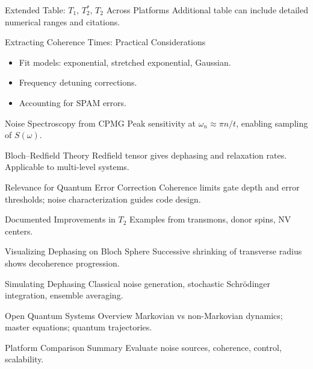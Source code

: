 \documentclass{beamer}
\begin{document}
  \begin{frame}{Extended Table: $T_1$, $T_2^*$, $T_2$ Across Platforms}
    Additional table can include detailed numerical ranges and citations.
  \end{frame}

  \begin{frame}{Extracting Coherence Times: Practical Considerations}
    \begin{itemize}
    \item Fit models: exponential, stretched exponential, Gaussian.
    \item Frequency detuning corrections.
    \item Accounting for SPAM errors.
    \end{itemize}
  \end{frame}

  \begin{frame}{Noise Spectroscopy from CPMG}
    Peak sensitivity at $\omega_n \approx \pi n/t$, enabling sampling of $S(\omega)$.
  \end{frame}

  \begin{frame}{Bloch–Redfield Theory}
    Redfield tensor gives dephasing and relaxation rates. Applicable to multi-level systems.
  \end{frame}

  \begin{frame}{Relevance for Quantum Error Correction}
    Coherence limits gate depth and error thresholds; noise characterization guides code design.
  \end{frame}

  \begin{frame}{Documented Improvements in $T_2$}
    Examples from transmons, donor spins, NV centers.
  \end{frame}

  \begin{frame}{Visualizing Dephasing on Bloch Sphere}
    Successive shrinking of transverse radius shows decoherence progression.
  \end{frame}

  \begin{frame}{Simulating Dephasing}
    Classical noise generation, stochastic Schrödinger integration, ensemble averaging.
  \end{frame}

  \begin{frame}{Open Quantum Systems Overview}
    Markovian vs non-Markovian dynamics; master equations; quantum trajectories.
  \end{frame}

  \begin{frame}{Platform Comparison Summary}
    Evaluate noise sources, coherence, control, scalability.
  \end{frame}

  
\end{document}
